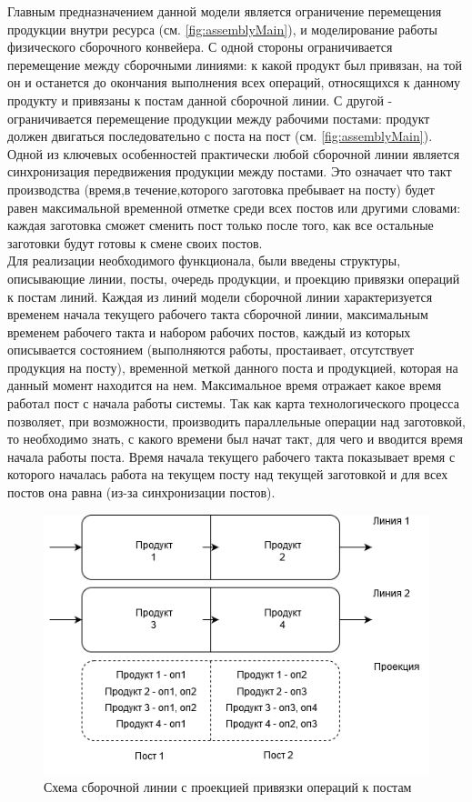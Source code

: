 \indent Главным предназначением данной модели является ограничение перемещения продукции внутри ресурса (см. \ref{fig:assemblyMain}), и моделирование работы физического сборочного конвейера.
С одной стороны ограничивается перемещение между сборочными линиями: к какой продукт был привязан, на той он и останется до окончания выполнения всех операций, относящихся к данному продукту и привязаны к постам данной сборочной линии.
С другой - ограничивается перемещение продукции между рабочими постами: продукт должен двигаться последовательно с поста на пост (см. \ref{fig:assemblyMain}).\\
\indent Одной из ключевых особенностей практически любой сборочной линии является синхронизация передвижения продукции между постами. 
Это означает что такт производства (время,в течение,которого заготовка пребывает на посту) будет равен максимальной временной отметке среди всех постов или другими словами: каждая заготовка сможет сменить пост только после того, как все остальные заготовки будут готовы к смене своих постов.\\
\indent Для реализации необходимого функционала, были введены структуры, описывающие линии, посты, очередь продукции, и проекцию привязки операций к постам линий.
Каждая из линий модели сборочной линии характеризуется временем начала текущего рабочего такта сборочной линии, максимальным временем рабочего такта и набором рабочих постов, каждый из которых описывается состоянием (выполняются работы, простаивает, отсутствует продукция на посту), временной меткой данного поста и продукцией, которая на данный момент находится на нем.
Максимальное время отражает какое время работал пост с начала работы системы.
Так как карта технологического процесса позволяет, при возможности, производить параллельные операции над заготовкой, то необходимо знать, с какого времени был начат такт, для чего и вводится время начала работы поста.
Время начала текущего рабочего такта показывает время с которого началась работа на текущем посту над текущей заготовкой и для всех постов она равна (из-за синхронизации постов).

\begin{figure}[ht]
	\centering
	\includegraphics[width=\linewidth]{pics/assemblyBind.png}
	\caption{Схема сборочной линии с проекцией привязки операций к постам}
	\label{fig:bind}
\end{figure}

